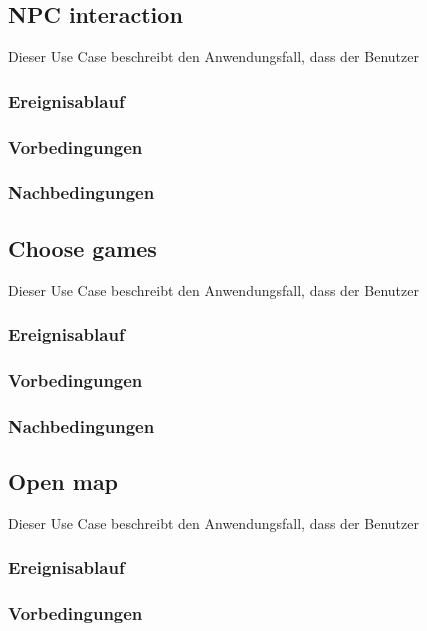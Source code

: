 	\subsection{NPC interaction}
		Dieser Use Case beschreibt den Anwendungsfall, dass der Benutzer 
			
		\subsubsection{Ereignisablauf}

		\subsubsection{Vorbedingungen}
			
		\subsubsection{Nachbedingungen}
	
	\subsection{Choose games}
		Dieser Use Case beschreibt den Anwendungsfall, dass der Benutzer 
			
		\subsubsection{Ereignisablauf}

		\subsubsection{Vorbedingungen}
			
		\subsubsection{Nachbedingungen}

	\subsection{Open map}
		Dieser Use Case beschreibt den Anwendungsfall, dass der Benutzer 
			
		\subsubsection{Ereignisablauf}
	
		\subsubsection{Vorbedingungen}
			
